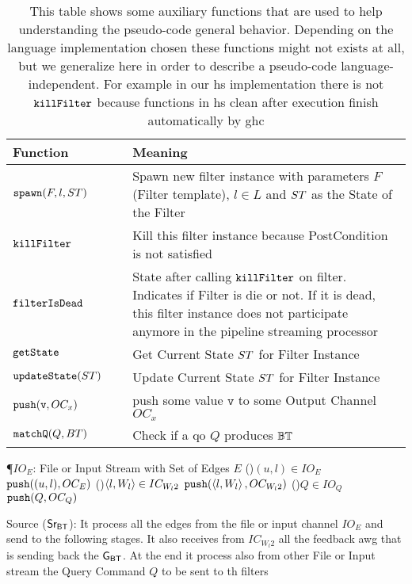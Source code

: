 \begin{table}[!htp]
\centering
\begin{tabular}{|p{0.3\linewidth}|p{0.7\linewidth}|} \hline
\textbf{Function} & \textbf{Meaning}\\ \hline
$\mathtt{spawn}(F,l,ST)$ & Spawn new filter instance with parameters $F$ (Filter template), $l \in L$ and $ST$ as the State of the Filter\\\hline
$\mathtt{killFilter}$ & Kill this filter instance because PostCondition is not satisfied\\ \hline
$\mathtt{filterIsDead}$ & State after calling $\mathtt{killFilter}$ on filter. Indicates if Filter is die or not. If it is dead, this filter instance does not participate anymore in the pipeline streaming processor\\ \hline
$\mathtt{getState}$ & Get Current State $ST$ for Filter Instance \\ \hline
$\mathtt{updateState}(ST)$ & Update Current State $ST$ for Filter Instance \\ \hline
$\mathtt{push}(\mathtt{v}, OC_x)$ & push some value $\mathtt{v}$ to some Output Channel $OC_x$ \\\hline
$\mathtt{matchQ}(Q, BT)$ & Check if a \acrshort{qo} $Q$ produces $\mathbb{BT}$ \\ \hline
\end{tabular}
\caption[{[\acrshort{iebt}] Summary of auxiliary functions for handling \acrshort{dpbt} internals}]{This table shows some auxiliary functions that are used to help understanding the pseudo-code general behavior. Depending on the language implementation chosen these functions might not exists at all, but we generalize here in order to describe a pseudo-code language-independent. For example in our \acrshort{hs} implementation there is not $\mathtt{killFilter}$ because functions in \acrshort{hs} clean after execution finish automatically by \acrshort{ghc}}
\label{table:aux:fn}
\end{table}
      
\begin{algorithm}[h!]
\SetAlgoRefName{[A1]}
\P{$IO_E$: File or Input Stream with Set of Edges $E$}
\ForAll(){$(u,l) \in IO_E$}
{$\mathtt{push}((u,l), OC_E)$ \label{algo:source:1}
}
\ForAll(){$\left\langle l, W_l \right\rangle \in IC_{W_l2}$}
{$\mathtt{push}(\left\langle l, W_l \right\rangle, OC_{W_l2})$ \label{algo:source:2}
}
\ForAll(){$Q \in IO_Q$}
{$\mathtt{push}(Q, OC_Q)$ \label{algo:source:3}
}
\caption[Source ($\ibt$)]{Source ($\ibt$): It process all the edges from the file or input channel $IO_E$ and send to the following stages. It also receives from $IC_{W_l2}$ all the feedback \acrshort{awg} that is sending back the $\mathsf{G_{BT}}$. At the end it process also from other File or Input stream the Query Command $Q$ to be sent to th filters}
\label{algo:source}
\end{algorithm}

